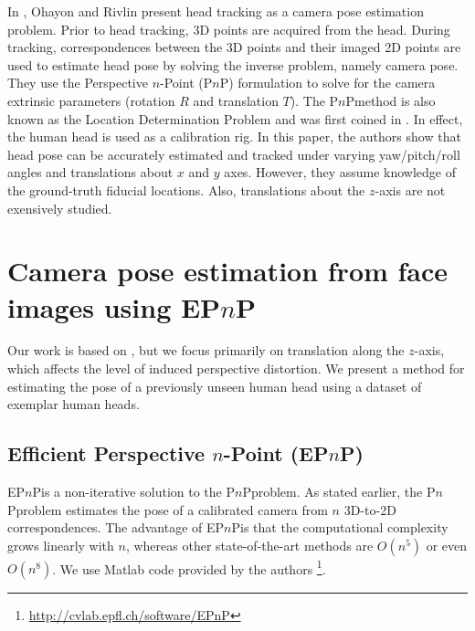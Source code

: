 \documentclass[runningheads]{llncs}
\newcommand {\PnP} {P$n$P}
\newcommand {\EPnP} {EP$n$P}
\begin{document}
In \cite{ohayon2006robust}, Ohayon and Rivlin present head tracking as a camera pose estimation problem.  
Prior to head tracking, 3D points are acquired from the head.  
During tracking, correspondences between the 3D points and their imaged 2D points are used to estimate head pose by solving the inverse problem, namely camera pose. 
They use the Perspective $n$-Point (\PnP) formulation to solve for the camera extrinsic parameters (rotation $R$ and translation $T$).  
The \PnP method is also known as the Location Determination Problem and was first coined in \cite{ransac}.  
In effect, the human head is used as a calibration rig.  
In this paper, the authors show that head pose can be accurately estimated and tracked under varying yaw/pitch/roll angles and translations about $x$ and $y$ axes. 
However, they assume knowledge of the ground-truth fiducial locations.
Also, translations about the $z$-axis are not exensively studied.  

\section{Camera pose estimation from face images using \EPnP}

Our work is based on \cite{ohayon2006robust}, but we focus primarily on translation along the $z$-axis, which affects the level of induced perspective distortion.  
We present a method for estimating the pose of a previously unseen human head using a dataset of exemplar human heads. 

\subsection{Efficient Perspective $n$-Point (\EPnP)}
\EPnP is a non-iterative solution to the \PnP problem.  
As stated earlier, the \PnP problem estimates the pose of a calibrated camera from $n$ 3D-to-2D correspondences.  
The advantage of \EPnP is that the computational complexity grows linearly with $n$, whereas other state-of-the-art methods are $O(n^5)$ or even $O(n^8)$.  
We use Matlab code provided by the authors \footnote{\url{http://cvlab.epfl.ch/software/EPnP}}.
\end{document}
